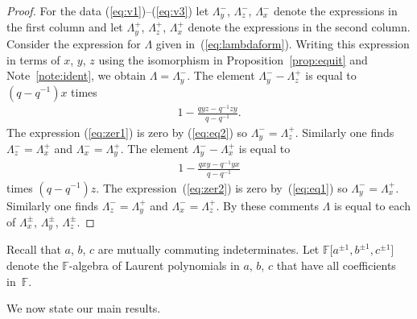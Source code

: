 \documentclass[pdftex]{sigma}
\numberwithin{equation}{section}
\begin{document}
\begin{proof}
For the data
(\ref{eq:v1})--(\ref{eq:v3})
let
$\Lambda^-_y$, $\Lambda^-_z$, $\Lambda^-_x$
denote the
expressions in the f\/irst column
and let
$\Lambda^+_y$, $\Lambda^+_z$, $\Lambda^+_x$ denote
the
expressions in the second column.
Consider the expression for
$\Lambda$ given in~(\ref{eq:lambdaform}).
Writing this expression in terms of $x$, $y$, $z$ using
the isomorphism in
Proposition~\ref{prop:equit} and Note~\ref{note:ident},
we obtain
$\Lambda=\Lambda^-_y$.
The element $\Lambda^-_y-\Lambda^+_z$ is equal to
$(q-q^{-1})x$ times
\begin{gather}
1 - \frac{qyz-q^{-1}zy}{q-q^{-1}}.
\label{eq:zer1}
\end{gather}
The expression
(\ref{eq:zer1}) is zero by
(\ref{eq:eq2}) so
$\Lambda^-_y=\Lambda^+_z$.
Similarly one f\/inds
$\Lambda^-_z=\Lambda^+_x$ and
$\Lambda^-_x=\Lambda^+_y$.
The element $\Lambda^-_y-\Lambda^+_x$ is equal to
\begin{gather}
1 - \frac{qxy-q^{-1}yx}{q-q^{-1}}
\label{eq:zer2}
\end{gather}
times
$(q-q^{-1})z$.
The expression~(\ref{eq:zer2}) is zero by~(\ref{eq:eq1}) so
$\Lambda^-_y=\Lambda^+_x$.
Similarly one f\/inds
$\Lambda^-_z=\Lambda^+_y$ and
$\Lambda^-_x=\Lambda^+_z$.
By these comments $\Lambda$ is equal to each of
$\Lambda^{\pm }_x$, $\Lambda^{\pm }_y$, $\Lambda^{\pm }_z$.
\end{proof}



Recall that $a$, $b$, $c$ are mutually commuting indeterminates.
Let
$\mathbb F \lbrack a^{\pm 1}, b^{\pm 1}, c^{\pm 1}\rbrack$
denote the $\mathbb F$-algebra
of Laurent polynomials in
$a$, $b$, $c$ that have all coef\/f\/icients in~$\mathbb F$.

We now state our main results.
\end{document}
